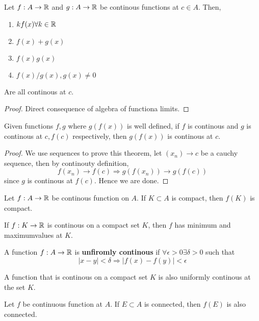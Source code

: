 \begin{theorem}
Let $f: A \to {\mathbb{R}}$ and $g: A \to {\mathbb{R}}$ be continous functions at $c \in A$. Then,
\begin{enumerate}
    \item $kf(x) \forall k \in {\mathbb{R}}$ 
    \item $f(x) +g(x)$ 
    \item $f(x)g(x)$ 
    \item $f(x)/g(x), g(x) \neq 0$
\end{enumerate}
Are all continous at $c$. 
\begin{proof}
    Direct consequence of algebra of functiona limits.
\end{proof}
\end{theorem}
\begin{theorem}
    Given functions $f,g$ where  $g(f(x))$ is well defined, if $f$ is continous and $g$ is continous at $c,f(c)$ respectively, then $g(f(x))$ is continous at $c$.
    \begin{proof}
        We use sequences to prove this theorem, let $(x_n) \to c$ be a cauchy sequence, then by continouty definition,
        \[ f(x_n) \to f(c) \Rightarrow g(f(x_n)) \to g(f(c))\]
        since $g$ is continous at $f(c)$. Hence we are done.
    \end{proof}
\end{theorem}
\begin{theorem} Let $f: A \to {\mathbb{R}}$ be continous function on $A$. If $K \subset A$ is compact, then $f(K)$ is compact.
\end{theorem}
\begin{theorem} If $f:K \to {\mathbb{R}}$ is continous on a compact set $K$, then $f$ has minimum and maximumvalues at $K$.
\end{theorem}
\begin{definition}
    A function $f:A \to {\mathbb{R}}$ is \textbf{unfiromly continous} if $\forall \epsilon >0 \exists \delta >0$ such that 
    \[ |x-y| < \delta \Rightarrow |f(x) -f(y)| < \epsilon\]
\end{definition}
\begin{theorem} A function that is continous on a compact set $K$ is also uniformly continous at the set $K$.
\end{theorem}

\begin{theorem} Let $f$ be continuous function at $A$. If $E \subset A$ is connected, then $f(E)$ is also connected.
\end{theorem}

